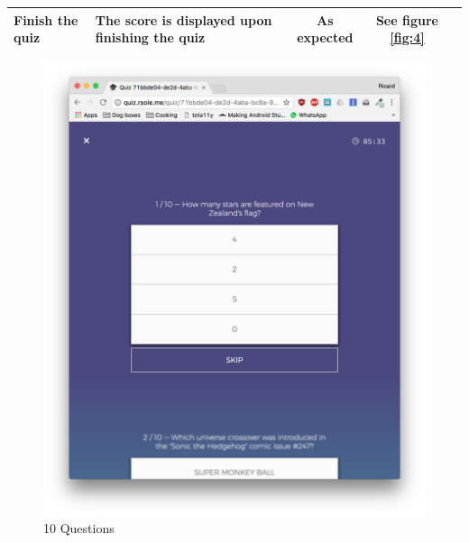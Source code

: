 \documentclass[english,a4paper,]{report}
\begin{document}
\begin{longtable}[]{@{}llccc@{}}
\begin{minipage}[t]{0.15\columnwidth}
Finish the quiz\strut
\end{minipage} & \begin{minipage}[t]{0.19\columnwidth}\centering\strut
The score is displayed upon finishing the quiz\strut
\end{minipage} & \begin{minipage}[t]{0.17\columnwidth}\centering\strut
As expected\strut
\end{minipage} & \begin{minipage}[t]{0.18\columnwidth}\centering\strut
See figure \ref{fig:4}\strut
\end{minipage}\tabularnewline
\bottomrule
\end{longtable}

\begin{figure}
\centering
\includegraphics{report/images/00.png}
\caption{10 Questions\label{fig:1}}
\end{figure}
\end{document}

